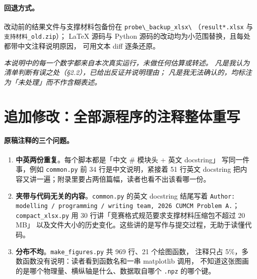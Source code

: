 \documentclass[11pt,a4paper]{ctexart}
\newcommand{\src}[1]{\texttt{#1}}
\begin{document}
\paragraph{回退方式。}
改动前的结果文件与支撑材料包备份在
\src{probe\textbackslash\_backup\_xlsx\textbackslash}
（\src{result*.xlsx} 与 \src{支持材料\_old.zip}）；
LaTeX 源码与 Python 源码的改动均为小范围替换，且每处都带中文注释说明原因，
可用文本 diff 逐条还原。

\vfill
\begin{center}
\small\itshape
本说明中的每一个数字都来自本次真实运行，未做任何估算或转述。
凡是我认为清单判断有误之处（§2.2），已给出反证并说明理由；
凡是我无法确认的，均标注为「未处理」而不作含糊表述。
\end{center}

\section{追加修改：全部源程序的注释整体重写}

\paragraph{原稿注释的三个问题。}
\begin{enumerate}[leftmargin=1.8em,itemsep=2pt]
  \item \textbf{中英两份重复}。每个脚本都是「中文 \# 模块头 + 英文 docstring」
  写同一件事，例如 \src{common.py} 前 34 行是中文说明，紧接着 51 行英文 docstring
  把内容又讲一遍；附录里要占两倍篇幅，读者也看不出该看哪一份。
  \item \textbf{夹带与代码无关的内容}。\src{common.py} 的英文 docstring 结尾写着
  \src{Author: modelling / programming / writing team, 2026 CUMCM Problem A.}；
  \src{compact\_xlsx.py} 用 30 行讲「竞赛格式规范要求支撑材料压缩包不超过 20 MB」
  以及文件大小的历史变化。这些讲的是写作与提交过程，无助于读懂代码。
  \item \textbf{分布不均}。\src{make\_figures.py} 共 969 行、21 个绘图函数，
  注释只占 5\%，多数函数没有说明：读者看到函数名和一串 matplotlib 调用，
  不知道这张图画的是哪个物理量、横纵轴是什么、数据取自哪个 \src{.npz} 的哪个键。
\end{enumerate}
\end{document}
